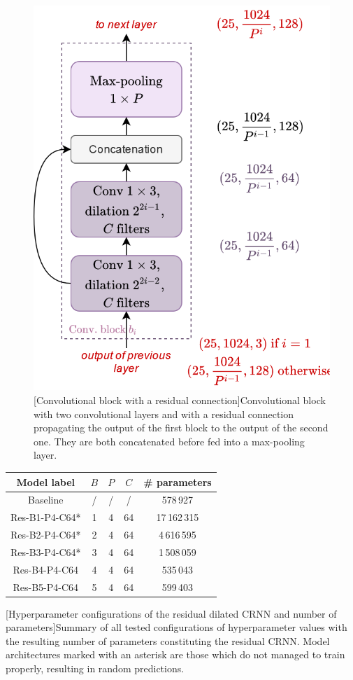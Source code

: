 \begin{figure}[ht]
    \begin{center}
    \includegraphics[width=0.5\linewidth]{Images/chap6/TDVVResidualConvBlock.png}
    [Convolutional block with a residual connection]{Convolutional block with two convolutional layers and with a residual connection propagating the output of the first block to the output of the second one. They are both concatenated before fed into a max-pooling layer.}
    \label{fig:TDVVResidualConvBlock}
    \end{center}
\end{figure}

\begin{table}[ht]
\centering
\begin{tabular}{|c|ccc|c|}
\hline
\textbf{Model label}   & \textbf{$B$} & \textbf{$P$}       & \textbf{$C$}        & \textbf{\# parameters} \\ \hline
Baseline      & /            & /                  & /                   & 578\,927               \\ \hline
Res-B1-P4-C64* & 1            & 4 & 64 & 17\,162\,315  \\
Res-B2-P4-C64* & 2            & 4 & 64 & 4\,616\,595   \\
Res-B3-P4-C64* & 3            & 4 & 64 & 1\,508\,059   \\
Res-B4-P4-C64 & 4            & 4 & 64 & 535\,043      \\
Res-B5-P4-C64 & 5            & 4 & 64 & 599\,403      \\ \hline
\end{tabular}
[Hyperparameter configurations of the residual dilated CRNN and number of parameters]{Summary of all tested configurations of hyperparameter values with the resulting number of parameters constituting the residual CRNN. Model architectures marked with an asterisk are those which do not managed to train properly, resulting in random predictions.}
\label{tab:TDVVresidualNetworksParameters}
\end{table}


